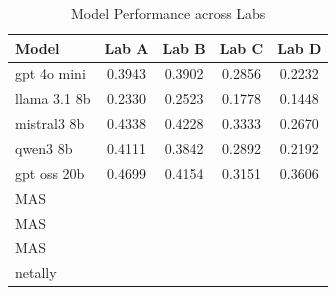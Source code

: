 \begin{table}[h]
\centering
\caption{Model Performance across Labs}
\begin{tabular}{lcccc}
\hline
Model & Lab A & Lab B & Lab C & Lab D \\
\hline
gpt 4o mini     & 0.3943 & 0.3902 & 0.2856 & 0.2232 \\
llama 3.1 8b    & 0.2330 & 0.2523 & 0.1778 & 0.1448 \\
mistral3 8b     & 0.4338 & 0.4228 & 0.3333 & 0.2670 \\
qwen3 8b        & 0.4111 & 0.3842 & 0.2892 & 0.2192      \\
gpt oss 20b     & 0.4699 & 0.4154 & 0.3151 & 0.3606 \\
\hline
MAS              &        &        &        &        \\
MAS              &        &        &        &        \\
MAS              &        &        &        &        \\
netally          &        &        &        &        \\
\hline
\end{tabular}
\end{table}